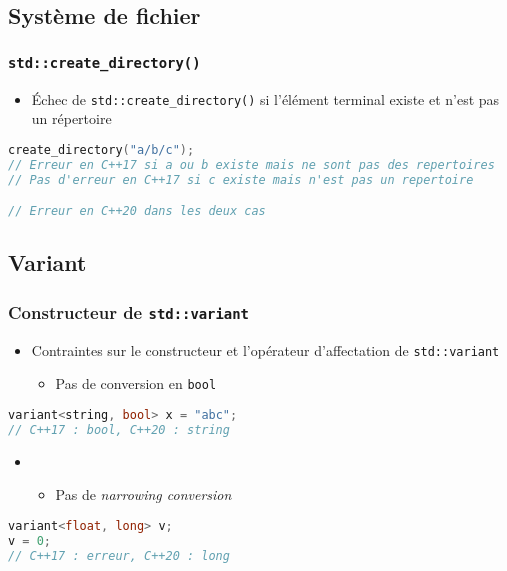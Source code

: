\documentclass[C++.tex]{subfiles}
\begin{document}
\subsection*{Système de fichier}
\begin{frame}[fragile]
	\frametitle{\lstinline|std::create_directory()|}
	\begin{itemize}
		\item Échec de \lstinline|std::create_directory()| si l'élément terminal existe et n'est pas un répertoire
	\end{itemize}

	\begin{lstlisting}[language=C++]
create_directory("a/b/c");
// Erreur en C++17 si a ou b existe mais ne sont pas des repertoires
// Pas d'erreur en C++17 si c existe mais n'est pas un repertoire

// Erreur en C++20 dans les deux cas\end{lstlisting}
\end{frame}

\subsection*{Variant}
\begin{frame}[fragile]
	\frametitle{Constructeur de \lstinline|std::variant|}
	\begin{itemize}
		\item Contraintes sur le constructeur et l'opérateur d'affectation de \lstinline|std::variant|
		\begin{itemize}
			\item Pas de conversion en \lstinline|bool|
		\end{itemize}
	\end{itemize}

	\begin{lstlisting}[language=C++]
variant<string, bool> x = "abc";
// C++17 : bool, C++20 : string\end{lstlisting}

	\begin{itemize}
		\item [] \begin{itemize}
			\item Pas de \textit{narrowing conversion}
		\end{itemize}
	\end{itemize}

	\begin{lstlisting}[language=C++]
variant<float, long> v;
v = 0;
// C++17 : erreur, C++20 : long\end{lstlisting}
\end{frame}
\end{document}
